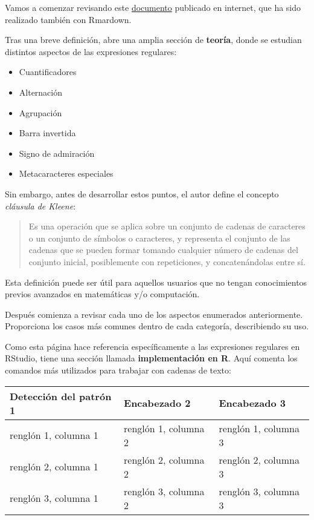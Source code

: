 \documentclass[]{article}
\providecommand{\tightlist}{%
  \setlength{\itemsep}{0pt}\setlength{\parskip}{0pt}}
\begin{document}
Vamos a comenzar revisando este
\href{http://rpubs.com/ydmarinb/429756}{documento} publicado en
internet, que ha sido realizado también con Rmardown.

Tras una breve definición, abre una amplia sección de \textbf{teoría},
donde se estudian distintos aspectos de las expresiones regulares:

\begin{itemize}
\tightlist
\item
  Cuantificadores
\item
  Alternación
\item
  Agrupación
\item
  Barra invertida
\item
  Signo de admiración
\item
  Metacaracteres especiales
\end{itemize}

Sin embargo, antes de desarrollar estos puntos, el autor define el
concepto \emph{cláusula de Kleene}:

\begin{quote}
Es una operación que se aplica sobre un conjunto de cadenas de
caracteres o un conjunto de símbolos o caracteres, y representa el
conjunto de las cadenas que se pueden formar tomando cualquier número de
cadenas del conjunto inicial, posiblemente con repeticiones, y
concatenándolas entre sí.
\end{quote}

Esta definición puede ser útil para aquellos usuarios que no tengan
conocimientos previos avanzados en matemáticas y/o computación.

Después comienza a revisar cada uno de los aspectos enumerados
anteriormente. Proporciona los casos más comunes dentro de cada
categoría, describiendo su uso.

Como esta página hace referencia específicamente a las expresiones
regulares en RStudio, tiene una sección llamada \textbf{implementación
en R}. Aquí comenta los comandos más utilizados para trabajar con
cadenas de texto:

\begin{longtable}[]{@{}lll@{}}
\toprule
Detección del patrón 1 & Encabezado 2 & Encabezado 3\tabularnewline
\midrule
\endhead
renglón 1, columna 1 & renglón 1, columna 2 & renglón 1, columna
3\tabularnewline
renglón 2, columna 1 & renglón 2, columna 2 & renglón 2, columna
3\tabularnewline
renglón 3, columna 1 & renglón 3, columna 2 & renglón 3, columna
3\tabularnewline
\bottomrule
\end{longtable}
\end{document}
